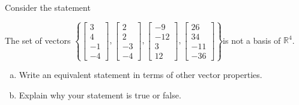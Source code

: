 
\begin{exerciseStatement}


Consider the statement 
\begin{center}\begin{minipage}{0.8\textwidth}
 The set of vectors \( \left\{ \left[\begin{array}{c}
3 \\
4 \\
-1 \\
-4
\end{array}\right] , \left[\begin{array}{c}
2 \\
2 \\
-3 \\
-4
\end{array}\right] , \left[\begin{array}{c}
-9 \\
-12 \\
3 \\
12
\end{array}\right] , \left[\begin{array}{c}
26 \\
34 \\
-11 \\
-36
\end{array}\right] \right\} \)is not a basis of \(\mathbb{R}^4\). 
\end{minipage}\end{center}
    


\begin{enumerate}[(a)]
\item  Write an equivalent statement in terms of other vector properties.
\item  Explain why your statement is true or false.
\end{enumerate}
    
\end{exerciseStatement}
    
